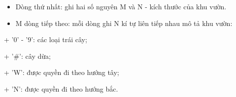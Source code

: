 \begin{itemize}
	\item     Dòng thứ nhất: ghi hai số nguyên M và N - kích thước của khu vườn.   
	\item     M dòng tiếp theo: mỗi dòng ghi N kí tự liên tiếp nhau mô tả khu vườn:   
\end{itemize}

   + '0' - '9': các loại trái cây;  

   + '\#': cây dừa;  

   + 'W': được quyền đi theo hướng tây;  

   + 'N': được quyền đi theo hướng bắc.